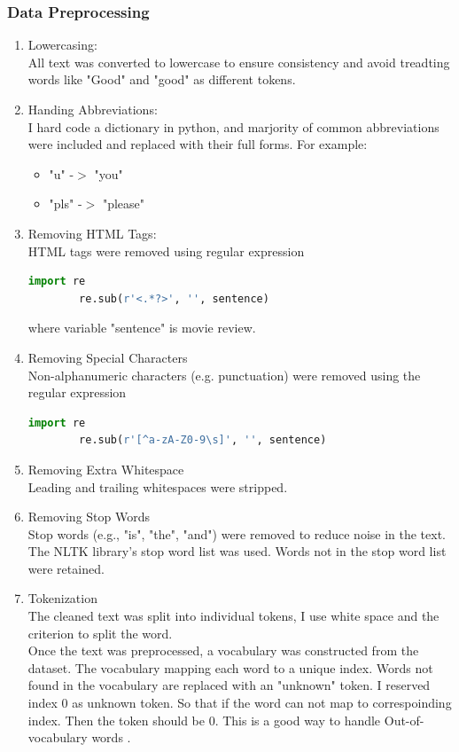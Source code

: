 \documentclass[12pt,a4paper]{article}
\begin{document}
\subsubsection{Data Preprocessing}
\begin{enumerate}
    \item Lowercasing:\\
    All text was converted to lowercase to ensure consistency and avoid treadting words like "Good" and "good" as different tokens.
    \item Handing Abbreviations:\\
    I hard code a dictionary in python, and marjority of common abbreviations were included and replaced with their full forms. For example:
    \begin{itemize}
        \item "u" -$>$ "you"
        \item "pls" -$>$ "please"
    \end{itemize}
    \item Removing HTML Tags:\\
    HTML tags were removed using regular expression 
    \begin{lstlisting}[language=Python] 
        import re
        re.sub(r'<.*?>', '', sentence) 
    \end{lstlisting}
    where variable "sentence" is movie review. 
    \item Removing Special Characters\\
    Non-alphanumeric characters (e.g. punctuation) were removed using the regular expression
    \begin{lstlisting}[language=Python]
        import re
        re.sub(r'[^a-zA-Z0-9\s]', '', sentence)
    \end{lstlisting}
    \item Removing Extra Whitespace\\
    Leading and trailing whitespaces were stripped. 
    \item Removing Stop Words\\
    Stop words (e.g., "is", "the", "and") were removed to reduce noise in the text. The NLTK library's stop word list was used. Words not in the stop word list were retained.
    \item Tokenization\\
    The cleaned text was split into individual tokens, I use white space and the criterion to split the word.
\\[1ex]
Once the text was preprocessed, a vocabulary was constructed from the dataset. The vocabulary mapping each word to a unique index. Words not found in the vocabulary are replaced with an "unknown" token. I reserved index 0 as unknown token. So that if the word can not map to correspoinding index. Then the token should be 0. This is a good way to handle Out-of-vocabulary words \parencite{mikolov2013efficient}.    

\end{enumerate}
\end{document}
